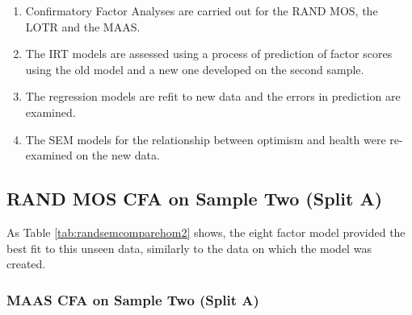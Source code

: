 \documentclass{article}
\begin{document}
\begin{enumerate}
\item Confirmatory Factor Analyses are carried out for the RAND MOS, the LOTR and the MAAS. 

\item The IRT models are assessed using a process of prediction of factor scores using the old model and a new one developed on the second sample. 

\item The regression models are refit to new data and the errors in prediction are examined. 

\item The SEM models for the relationship between optimism and health were re-examined on the new data. 
\end{enumerate}




\subsection{RAND MOS CFA on Sample Two (Split A)}
\label{sec:rand-mos-cfa}









\begin{table}[ht]
\centering
{}
\caption{Model Comparison for RAND MOS data using Models from Sample 1 on Sample 2} 
\label{tab:randsemcomparehom2}
\end{table}
As Table \ref{tab:randsemcomparehom2} shows, the eight factor model provided the best fit to this unseen data, similarly to the data on which the model was created. 

\subsubsection{MAAS CFA on Sample Two (Split A)}
\label{sec:maas-cfa-sample}
\end{document}
